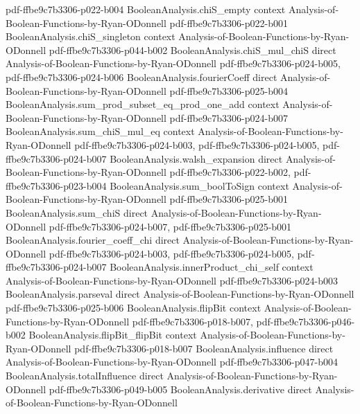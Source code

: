 \begin{theorem}
  {pdf-ffbe9c7b3306-p022-b004}
\proofstep
  {BooleanAnalysis.chiS_empty}
  {context}
  {Analysis-of-Boolean-Functions-by-Ryan-ODonnell}
  {pdf-ffbe9c7b3306-p022-b001}
\proofstep
  {BooleanAnalysis.chiS_singleton}
  {context}
  {Analysis-of-Boolean-Functions-by-Ryan-ODonnell}
  {pdf-ffbe9c7b3306-p044-b002}
\proofstep
  {BooleanAnalysis.chiS_mul_chiS}
  {direct}
  {Analysis-of-Boolean-Functions-by-Ryan-ODonnell}
  {pdf-ffbe9c7b3306-p024-b005,
    pdf-ffbe9c7b3306-p024-b006}
\proofstep
  {BooleanAnalysis.fourierCoeff}
  {direct}
  {Analysis-of-Boolean-Functions-by-Ryan-ODonnell}
  {pdf-ffbe9c7b3306-p025-b004}
\proofstep
  {BooleanAnalysis.sum_prod_subset_eq_prod_one_add}
  {context}
  {Analysis-of-Boolean-Functions-by-Ryan-ODonnell}
  {pdf-ffbe9c7b3306-p024-b007}
\proofstep
  {BooleanAnalysis.sum_chiS_mul_eq}
  {context}
  {Analysis-of-Boolean-Functions-by-Ryan-ODonnell}
  {pdf-ffbe9c7b3306-p024-b003,
    pdf-ffbe9c7b3306-p024-b005,
    pdf-ffbe9c7b3306-p024-b007}
\proofstep
  {BooleanAnalysis.walsh_expansion}
  {direct}
  {Analysis-of-Boolean-Functions-by-Ryan-ODonnell}
  {pdf-ffbe9c7b3306-p022-b002,
    pdf-ffbe9c7b3306-p023-b004}
\proofstep
  {BooleanAnalysis.sum_boolToSign}
  {context}
  {Analysis-of-Boolean-Functions-by-Ryan-ODonnell}
  {pdf-ffbe9c7b3306-p025-b001}
\proofstep
  {BooleanAnalysis.sum_chiS}
  {direct}
  {Analysis-of-Boolean-Functions-by-Ryan-ODonnell}
  {pdf-ffbe9c7b3306-p024-b007,
    pdf-ffbe9c7b3306-p025-b001}
\proofstep
  {BooleanAnalysis.fourier_coeff_chi}
  {direct}
  {Analysis-of-Boolean-Functions-by-Ryan-ODonnell}
  {pdf-ffbe9c7b3306-p024-b003,
    pdf-ffbe9c7b3306-p024-b005,
    pdf-ffbe9c7b3306-p024-b007}
\proofstep
  {BooleanAnalysis.innerProduct_chi_self}
  {context}
  {Analysis-of-Boolean-Functions-by-Ryan-ODonnell}
  {pdf-ffbe9c7b3306-p024-b003}
\proofstep
  {BooleanAnalysis.parseval}
  {direct}
  {Analysis-of-Boolean-Functions-by-Ryan-ODonnell}
  {pdf-ffbe9c7b3306-p025-b006}
\proofstep
  {BooleanAnalysis.flipBit}
  {context}
  {Analysis-of-Boolean-Functions-by-Ryan-ODonnell}
  {pdf-ffbe9c7b3306-p018-b007,
    pdf-ffbe9c7b3306-p046-b002}
\proofstep
  {BooleanAnalysis.flipBit_flipBit}
  {context}
  {Analysis-of-Boolean-Functions-by-Ryan-ODonnell}
  {pdf-ffbe9c7b3306-p018-b007}
\proofstep
  {BooleanAnalysis.influence}
  {direct}
  {Analysis-of-Boolean-Functions-by-Ryan-ODonnell}
  {pdf-ffbe9c7b3306-p047-b004}
\proofstep
  {BooleanAnalysis.totalInfluence}
  {direct}
  {Analysis-of-Boolean-Functions-by-Ryan-ODonnell}
  {pdf-ffbe9c7b3306-p049-b005}
\proofstep
  {BooleanAnalysis.derivative}
  {direct}
  {Analysis-of-Boolean-Functions-by-Ryan-ODonnell}

\end{theorem}
